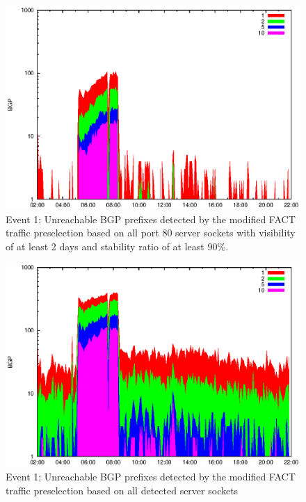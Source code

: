 \begin{figure}
	[p] \centering 
	\includegraphics[width=0.75\linewidth]{images/events/2010_03_25/bgp_log_port80_Set_stab_9_vts_2.eps}
	\caption{Event 1: Unreachable BGP prefixes detected by the modified FACT traffic preselection based on all port 80 server sockets with visibility of at least 2 days and stability ratio of at least $90\%$.} 
	\label{fig:AMS_IX_FACT_allSES80VTS2STAB9} 
\end{figure}

\begin{figure}
	[p] \centering 
	\includegraphics[width=0.75\linewidth]{images/events/2010_03_25/bgp_log_all_external.eps}
	\caption{Event 1: Unreachable BGP prefixes detected by the modified FACT traffic preselection based on all detected server sockets} 
	\label{fig:AMS_IX_FACT_allSES} 
\end{figure}

